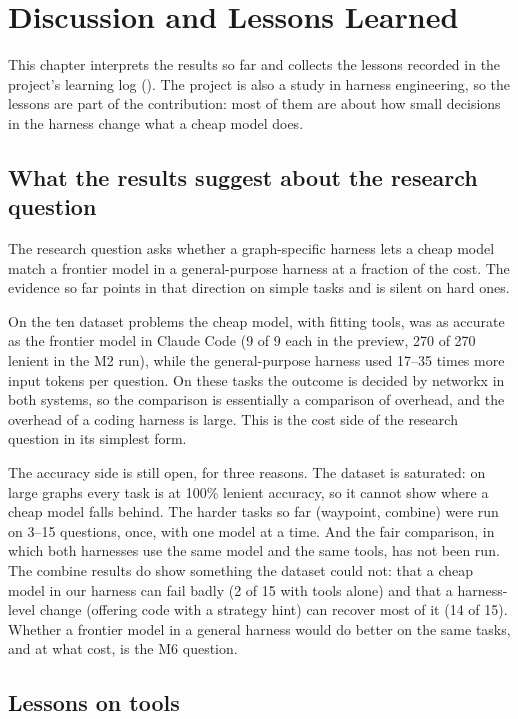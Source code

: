 \chapter{Discussion and Lessons Learned}
\label{ch:discussion}

This chapter interprets the results so far and collects the lessons recorded in the project's learning log
(). The project is also a study in harness engineering, so the lessons are part of the
contribution: most of them are about how small decisions in the harness change what a cheap model does.

\section{What the results suggest about the research question}

The research question asks whether a graph-specific harness lets a cheap model match a frontier model in a
general-purpose harness at a fraction of the cost. The evidence so far points in that direction on simple tasks and
is silent on hard ones.

On the ten dataset problems the cheap model, with fitting tools, was as accurate as the frontier model in Claude Code
(9 of 9 each in the preview, 270 of 270 lenient in the M2 run), while the general-purpose harness used 17--35 times
more input tokens per question. On these tasks the outcome is decided by networkx in both systems, so the comparison
is essentially a comparison of overhead, and the overhead of a coding harness is large. This is the cost side of the
research question in its simplest form.

The accuracy side is still open, for three reasons. The dataset is saturated: on large graphs every task is at 100\%
lenient accuracy, so it cannot show where a cheap model falls behind. The harder tasks so far (waypoint, combine) were
run on 3--15 questions, once, with one model at a time. And the fair comparison, in which both harnesses use the same
model and the same tools, has not been run. The combine results do show something the dataset could not: that a cheap
model in our harness can fail badly (2 of 15 with tools alone) and that a harness-level change (offering code with a
strategy hint) can recover most of it (14 of 15). Whether a frontier model in a general harness would do better on the
same tasks, and at what cost, is the M6 question.

\section{Lessons on tools}

